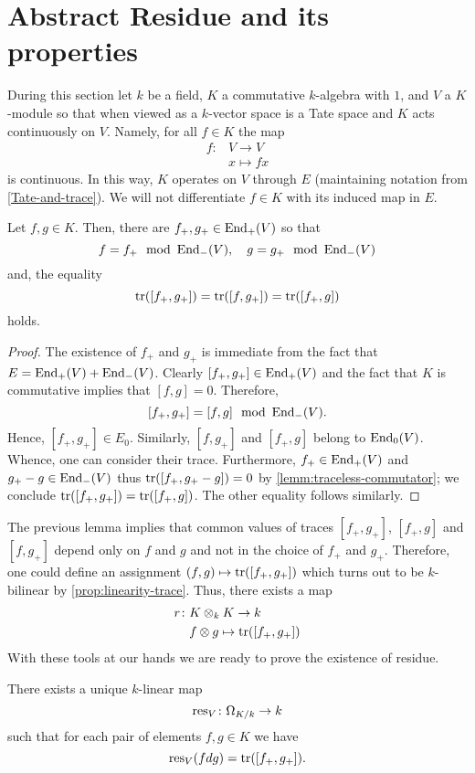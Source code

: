 \section{Abstract Residue and its properties}
During this section let $k$ be a field, $K$ a commutative $k$-algebra with $1$, and $V$ a $K$-module so that when viewed as a $k$-vector space is a Tate space and $K$ acts continuously on $V$. Namely, for all $f \in K$ the map 
\begin{align*}
	f\colon &V \to V \\
	&x \mapsto fx 
\end{align*}
is continuous. In this way, $K$ operates on $V$ through $E$ (maintaining notation from \cref{Tate-and-trace}). We will not differentiate $f\in K$ with its induced map in $E$.
\begin{lemma}\label{lemm:trace-only-depends-on-K}
	Let $f,g \in K$. Then, there are $f_{+}, g_{+} \in \operatorname{End}_{+}(V)$ so that 
	\[
	f = f_{+} \mod {\operatorname{End}}_{-}(V) ,\quad g = g_{+} \mod {\operatorname{End}}_{-}(V)
	\]
	and, the equality
	\[
		\operatorname{tr}([f_{+},g_{+}]) = \operatorname{tr}([f, g_{+}]) = \operatorname{tr}([f_{+}, g])
	\]
	holds.
\end{lemma}
\begin{proof}
The existence of $f_{+}$ and $g_{+}$ is immediate from the fact that $E = \operatorname{End}_{+}(V) + \operatorname{End}_{-}(V)$.  Clearly $[f_{+},g_{+}]\in \operatorname{End}_{+}(V)$ and the fact that $K$ is commutative implies that $[f,g] = 0$. Therefore,
\[
	[f_{+},g_{+}] = [f,g] \mod {\operatorname{End}}_{-}(V).
\]
Hence, $[f_{+},g_{+}]\in E_0$. Similarly, $[f,g_{+}]$ and $[f_{+}, g]$ belong to $\operatorname{End}_{0}(V)$. Whence, one can consider their trace. Furthermore, $f_{+} \in \operatorname{End}_{+}(V)$ and $g_{+} - g \in \operatorname{End}_{-}(V)$ thus $\operatorname{tr}([f_{+}, g_{+} - g]) = 0$ by \cref{lemm:traceless-commutator}; we conclude $\operatorname{tr}([f_{+}, g_{+}]) = \operatorname{tr}([f_{+}, g])$. The other equality follows similarly.
\end{proof}
The previous lemma implies that common values of traces $[f_{+},g_{+}]$, $[f_{+}, g]$ and $[f, g_{+}]$ depend only on $f$ and $g$ and not in the choice of $f_{+}$ and $g_{+}$. Therefore, one could define an assignment $(f,g) \mapsto \operatorname{tr}([f_{+}, g_{+}])$ which turns out to be $k$-bilinear by \cref{prop:linearity-trace}. Thus, there exists a map
\begin{align*}
	r\colon &K\otimes_{k} K \to k \\
	&f \otimes g \mapsto \operatorname{tr}([f_{+}, g_{+}])
\end{align*}
With these tools at our hands we are ready to prove the existence of residue.
\begin{theorem}\label{thm:existence-of-residue}
	There exists a unique $k$-linear map
	\[
		\operatorname{res}_{V}\colon \Omega_{K/k}\to k
	\]
	such that for each pair of elements $f,g \in K$ we have
	\[
		\operatorname{res}_{V}(fdg) = \operatorname{tr}([f_{+}, g_{+}]).
	\]
\end{theorem}
